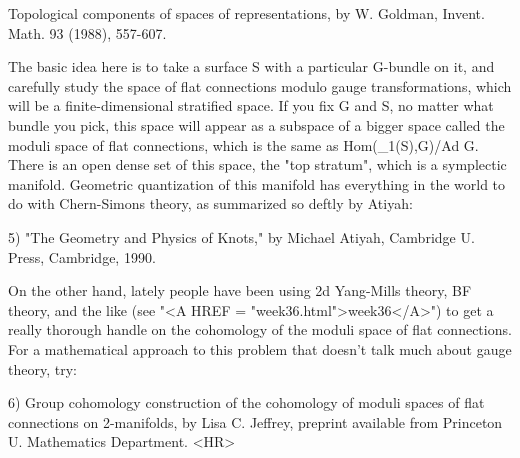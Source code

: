 Topological components of spaces of representations, by W. Goldman, Invent.
Math. 93 (1988), 557-607.


The basic idea here is to take a surface S with a particular G-bundle on
it, and carefully study the space of flat connections modulo gauge
transformations, which will be a finite-dimensional stratified space.
If you fix G and S, no matter what bundle you pick, this space will
appear as a subspace of a bigger space called the moduli space of flat
connections, which is the same as Hom(\pi _1(S),G)/Ad G.  There is an open
dense set of this space, the "top stratum", which is a symplectic
manifold.  Geometric quantization of this manifold has everything in the
world to do with Chern-Simons theory, as summarized so deftly by Atiyah:

5) "The Geometry and Physics of Knots," by Michael Atiyah, Cambridge U.
Press, Cambridge, 1990. 

On the other hand, lately people have been using 2d Yang-Mills theory, BF
theory, and the like (see "<A HREF = "week36.html">week36</A>") to get a really thorough handle on
the cohomology of the moduli space of flat connections.  For a
mathematical approach to this problem that doesn't talk much about gauge
theory, try:

6) Group cohomology construction of the cohomology of moduli spaces of
flat connections on 2-manifolds, by Lisa C. Jeffrey, preprint available
from Princeton U. Mathematics Department.  
<HR>



